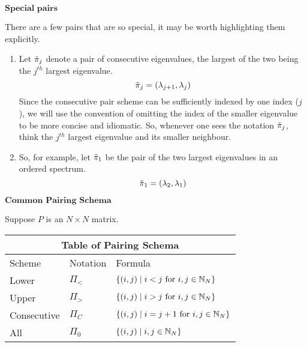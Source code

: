 
\newpage

\begin{center}
$\textbf{Special pairs}$
\end{center}

There are a few pairs that are so special, it may be worth highlighting them explicitly.

\begin{enumerate}
  \item Let ${\tilde{\pi}}_j$ denote a pair of consecutive eigenvalues, the largest of the two being the $j^{th}$ largest eigenvalue.
  $${{\tilde{\pi}}}_j = (\lambda_{j+1},\lambda_{j})$$
  Since the consecutive pair scheme can be sufficiently indexed by one index ($j$), we will use the convention of omitting the index of the smaller eigenvalue to be more concise and idiomatic. So, whenever one sees the notation ${\tilde{\pi}}_j$, think the $j^{th}$ largest eigenvalue and its smaller neighbour.
  \item So, for example, let ${\tilde{\pi}}_1$ be the pair of the two largest eigenvalues in an ordered spectrum. 
  $${\tilde{\pi}}_1 = (\lambda_2,\lambda_1)$$
\end{enumerate}

\begin{center}
$\textbf{Common Pairing Schema}$
\end{center}

Suppose $P$ is an $N \times N$ matrix. \newline

\begin{tabular}{ |p{2.5cm}||p{1.75cm}|p{5.5cm}|  }
 \hline
 \multicolumn{3}{|c|}{Table of Pairing Schema} \\
 \hline
 Scheme & Notation & Formula \\
 \hline
 Lower & $\Pi_<$ & $\{(i,j) \mid i < j \text{ for } i,j \in \mathbb{N}_N \}$ \\
 Upper  & $\Pi_>$ & $\{(i,j) \mid i > j \text{ for } i,j \in \mathbb{N}_N \}$ \\
 Consecutive  & $\Pi_C$ & $\{(i,j) \mid i = j + 1 \text{ for } i,j \in \mathbb{N}_N \}$ \\
 All & $\Pi_0$ & $\{(i,j) \mid i,j \in \mathbb{N}_N \}$ \\
 \hline
\end{tabular}

